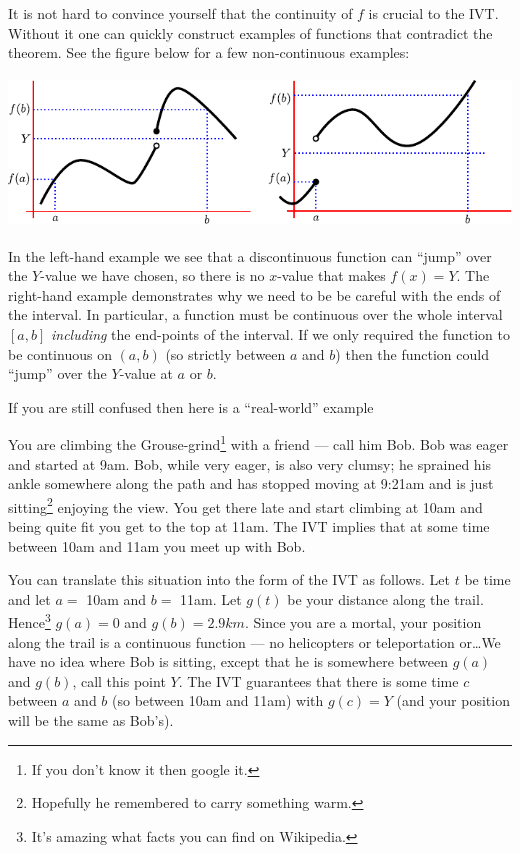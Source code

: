 It is not hard to convince yourself that the continuity of $f$ is crucial to
the IVT. Without it one can quickly construct examples of functions that
contradict the theorem. See the figure below for a few non-continuous examples:
\begin{fig}
\begin{center}
 \includegraphics[height=4cm]{IVT2}
\end{center}
\end{fig}
In the left-hand example we see that a discontinuous function can ``jump'' over
the $Y$-value we have chosen, so there is no $x$-value that makes $f(x)=Y$. The
right-hand example demonstrates why we need to be be careful with the ends of
the interval. In particular, a function must be continuous over the whole
interval $[a,b]$ \emph{including} the end-points of the interval. If we only
required the function to be continuous on $(a,b)$ (so strictly between $a$ and
$b$) then the function could ``jump'' over the $Y$-value at $a$ or $b$.

If you are still confused then here is a ``real-world'' example
\begin{eg}
 You are climbing the Grouse-grind\footnote{If you don't know it then google
it.} with a friend --- call him Bob. Bob was eager and started at 9am. Bob,
while very eager, is also very clumsy; he sprained his ankle somewhere
along the path and has stopped moving at 9:21am and is just
sitting\footnote{Hopefully he remembered to carry something warm.} enjoying the
view. You get there late and start climbing at 10am and being quite fit you get to the
top at 11am. The IVT implies that at some time between 10am and 11am you
meet up with Bob.

You can translate this situation into the form of the IVT as follows. Let $t$
be time and let $a = $ 10am and $b=$ 11am. Let $g(t)$ be your distance
along the trail. Hence\footnote{It's amazing what facts you can find
on Wikipedia.} $g(a) = 0$ and
$g(b) = 2.9km$. Since you are a mortal, your position along the trail is a
continuous function --- no helicopters or teleportation or\dots We have no idea
where Bob is sitting, except that he is somewhere between $g(a)$ and
$g(b)$, call this point $Y$. The IVT guarantees that there is some time $c$
between $a$ and $b$ (so between 10am and 11am) with $g(c) = Y$ (and your
position will be the same as Bob's).
\end{eg}

